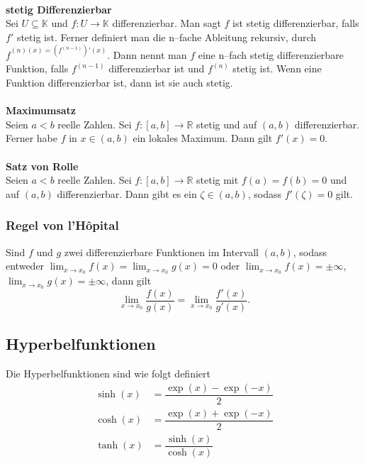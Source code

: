 \documentclass[a4paper,12pt]{article}
\begin{document}
\hfill\\\textbf{stetig Differenzierbar}\\ 
Sei $U\subseteq \mathbb{K}$ und $f:U\rightarrow \mathbb{K}$ differenzierbar. Man sagt $f$ ist stetig differenzierbar, falls $f'$ stetig ist. Ferner definiert man die n--fache Ableitung rekursiv, durch $f^{\left(n\right)\left(x\right)=\left(f^{\left(n-1\right)}\right)'\left(x\right)}$. Dann nennt man $f$ eine n--fach stetig differenzierbare Funktion, falls $f^{\left(n-1\right)}$ differenzierbar ist und $f^{\left(n\right)}$ stetig ist. Wenn eine Funktion differenzierbar ist, dann ist sie auch stetig.
\\\hfill\\\textbf{Maximumsatz}\\ 
Seien $a<b$ reelle Zahlen. Sei $f:[a,b]\rightarrow \mathbb{R}$ stetig und auf $\left(a,b\right)$ differenzierbar. Ferner habe $f$ in $x \in \left(a,b\right)$ ein lokales Maximum. Dann gilt $f'\left(x\right)=0$.
\\\hfill\\\textbf{Satz von Rolle}\\ 
Seien $a<b$ reelle Zahlen. Sei $f:[a,b]\rightarrow \mathbb{R}$ stetig mit $f\left(a\right)=f\left(b\right)=0$ und auf $\left(a,b\right)$ differenzierbar. Dann gibt es ein $\zeta  \in \left(a,b\right)$, sodass $f'\left(\zeta \right)=0$ gilt.

\subsubsection{Regel von l'H\^{o}pital}
Sind $f$ und $g$ zwei differenzierbare Funktionen im Intervall $\left(a,b\right)$, sodass entweder $\lim_{x\rightarrow x_0}f\left(x\right)=\lim_{x\rightarrow x_0}g\left(x\right)=0$ oder $\lim_{x\rightarrow x_0}f\left(x\right)=\pm \infty$, $\lim_{x\rightarrow x_0}g\left(x\right)=\pm \infty$, dann gilt
\[ 
        \lim_{x\rightarrow x_0}\dfrac{f\left(x\right)}{g\left(x\right)}=\lim_{x\rightarrow x_0}\dfrac{f'\left(x\right)}{g'\left(x\right)}
.\] 

\subsection{Hyperbelfunktionen}
Die Hyperbelfunktionen sind wie folgt definiert
\begin{align*} %
        \sinh\left(x\right)&=\dfrac{\exp\left(x\right)-\exp\left(-x\right)}{2}\\
        \cosh\left(x\right)&=\dfrac{\exp\left(x\right)+\exp\left(-x\right)}{2}\\
        \tanh\left(x\right)&=\dfrac{\sinh\left(x\right)}{\cosh\left(x\right)}
\end{align*}
\end{document}
